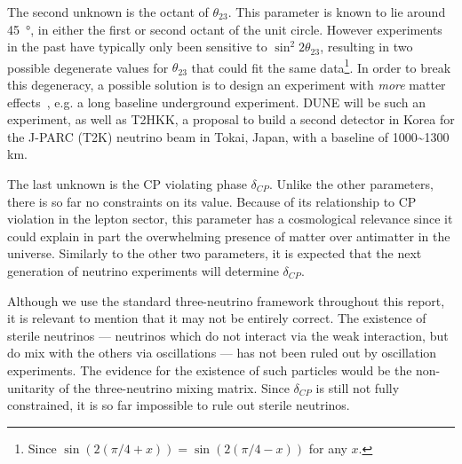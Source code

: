 The second unknown is the octant of $\theta_{23}$. This parameter is known to
lie around \SI{45}{\degree}, in either the first or second octant of the unit
circle. However experiments in the past have typically only been
sensitive to $\sin^2{2 \theta_{23}}$, resulting in two possible degenerate
values for $\theta_{23}$ that could fit the same data\footnote{Since
$\sin(2(\pi/4+x)) = \sin(2(\pi/4-x))$ for any $x$.}\cite{novat23}.
In order to break this degeneracy, a possible solution is to design an
experiment with \emph{more} matter effects~\cite{raut}, e.g. a long baseline
underground experiment. DUNE will be such an experiment, as well as
T2HKK, a proposal to build a second detector in Korea for the J-PARC (T2K) neutrino
beam in Tokai, Japan, with a baseline of 1000\textasciitilde1300 km\cite{t2hkk}.

The last unknown is the CP violating phase $\delta_{CP}$. Unlike the other
parameters, there is so far no constraints on its value.
Because of its relationship to CP violation in the lepton sector, this
parameter has a cosmological relevance since it could explain in part the
overwhelming presence of matter over antimatter in the universe. Similarly to
the other two parameters, it is expected that the next generation of neutrino
experiments will determine $\delta_{CP}$.

Although we use the standard three-neutrino framework throughout this report,
it is relevant to mention that it may not be entirely correct. The existence of
sterile neutrinos --- neutrinos which do not interact via the weak interaction,
but do mix with the others via oscillations --- has not been ruled out by
oscillation experiments. The evidence for the existence of such particles would
be the non-unitarity of the three-neutrino mixing matrix. Since
$\delta_{CP}$ is still not fully constrained, it is so far impossible to rule out
sterile neutrinos.
